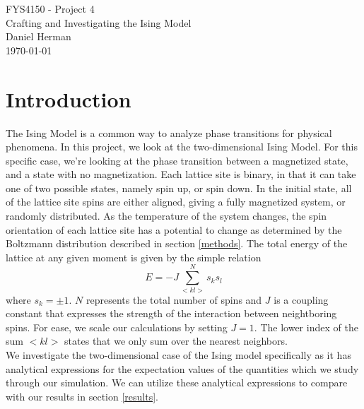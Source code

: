 \documentclass[a4paper]{article}
\begin{document}
	\begin{center}
	  {\huge FYS4150 - Project 4}\\[2ex]
      {\huge Crafting and Investigating the Ising Model}\\[8ex]
	  {\large Daniel Herman}\\[4ex]
      \normalsize
      \today
	\end{center}

\begin{abstract}
The Ising model is a commonly utilized model of statistical systems. In this project, we create our own Ising model using the programming language c++. The code is parallelized using OpenMPI, and python programs were written to extract and plot data output by the c++ program. The Monte Carlo Markov Chain is used to cycle through our model, and accepted changes to the model are determined using the Metropolis algorithm. Both of these methods utilize random number generators picking from a uniform distribution. This approach has proved very successful for run times of at least $10^6$ Monte Carlo cycles, showing convergence to the analytical solutions predicted by statistical mechanics.
\end{abstract}
\clearpage

\section{Introduction}\label{intro}
The Ising Model is a common way to analyze phase transitions for physical phenomena. In this project, we look at the two-dimensional Ising Model. For this specific case, we're looking at the phase transition between a magnetized state, and a state with no magnetization. Each lattice site is binary, in that it can take one of two possible states, namely spin up, or spin down. In the initial state, all of the lattice site spins are either aligned, giving a fully magnetized system, or randomly distributed. As the temperature of the system changes, the spin orientation of each lattice site has a potential to change as determined by the Boltzmann distribution described in section \ref{methods}. The total energy of the lattice at any given moment is given by the simple relation
\begin{equation}\label{eq:mesh1}
E=-J\sum_{< kl >}^{N}s_ks_l 
\end{equation}
where $s_k = \pm 1$. $N$ represents the total number of spins and $J$ is a coupling constant that expresses the strength of the interaction between neightboring spins. For ease, we scale our calculations by setting $J=1$. The lower index of the sum $<kl>$ states that we only sum over the nearest neighbors.\\
We investigate the two-dimensional case of the Ising model specifically as it has analytical expressions for the expectation values of the quantities which we study through our simulation. We can utilize these analytical expressions to compare with our results in section \ref{results}.
\end{document}
